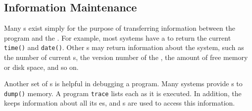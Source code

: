 \subsection{Information Maintenance}\label{subsec:Information_Maintenance}
Many s exist simply for the purpose of transferring information between the  program and the .
For example, most systems have a  to return the current \texttt{time()} and \texttt{date()}.
Other s may return information about the system, such as the number of current s, the version number of the , the amount of free memory or disk space, and so on.

Another set of s is helpful in debugging a program.
Many systems provide s to \texttt{dump()} memory.
A program \texttt{trace} lists each  as it is executed.
In addition, the  keeps information about all its es, and s are used to access this information.

